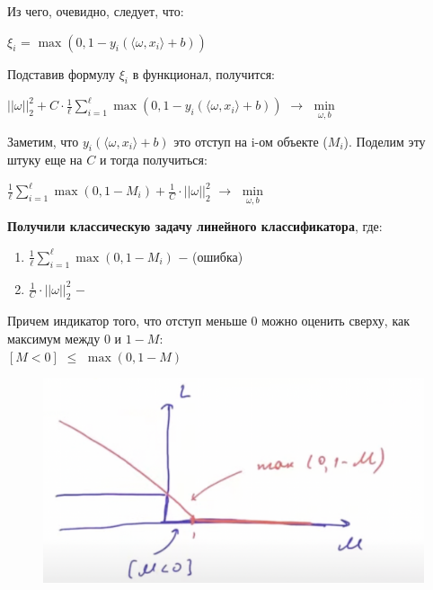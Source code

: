             Из чего, очевидно, следует, что:
            \begin{center}
                $\xi_i$ = $\max(0, 1 -  y_i(\langle\omega, x_i\rangle + b))$
            \end{center}

            Подставив формулу $\xi_i$ в функционал, получится:
            \begin{center}
            \large
                $||\omega||_2^2 + C\cdot\frac{1}{\ell}\sum\limits_{i = 1}^\ell\max(0, 1 -  y_i(\langle\omega, x_i\rangle + b))$ $\longrightarrow$ $\min\limits_{\omega, b}$
            \end{center}

            Заметим, что $y_i(\langle\omega, x_i\rangle + b)$ это отступ на i-ом объекте ($M_i$). Поделим эту штуку еще на $C$ и тогда получиться:
            \begin{center}
                \large

                $\frac{1}{\ell}\sum\limits_{i = 1}^\ell\max(0, 1 - M_i) + \frac{1}{C}\cdot||\omega||_2^2$ $\longrightarrow$ $\min\limits_{\omega, b}$
            \end{center}

            \textbf{Получили классическую задачу линейного классификатора}, где:
            \begin{enumerate}
                \item $\frac{1}{\ell}\sum\limits_{i = 1}^\ell\max(0, 1 - M_i)$ $-$  (ошибка)

                \item $\frac{1}{C}\cdot||\omega||_2^2$ $-$ 
            \end{enumerate}
            Причем индикатор того, что отступ меньше $0$ можно оценить сверху, как максимум между $0$ и $1 - M$:\\

            $[M < 0]$ $\leq$ $\max(0, 1 - M)$

            \begin{figure}[H]
                \centering
                \includegraphics[width=0.5  \textwidth]{images/7lecture/SVM_to_linear_classification.png}
            \end{figure}

